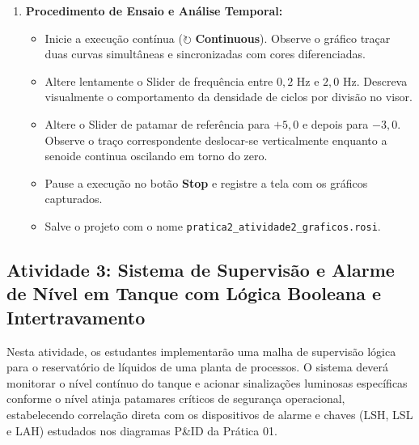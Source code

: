 \documentclass[11pt,a4paper]{article}
\begin{document}
\begin{enumerate}
\begin{itemize}
    \end{itemize}
    \item \textbf{Procedimento de Ensaio e Análise Temporal:}
    \begin{itemize}
        \item Inicie a execução contínua ($\circlearrowright$ \textbf{Continuous}). Observe o gráfico traçar duas curvas simultâneas e sincronizadas com cores diferenciadas.
        \item Altere lentamente o Slider de frequência entre $0{,}2\text{ Hz}$ e $2{,}0\text{ Hz}$. Descreva visualmente o comportamento da densidade de ciclos por divisão no visor.
        \item Altere o Slider de patamar de referência para $+5{,}0$ e depois para $-3{,}0$. Observe o traço correspondente deslocar-se verticalmente enquanto a senoide continua oscilando em torno do zero.
        \item Pause a execução no botão \textbf{Stop} e registre a tela com os gráficos capturados.
        \item Salve o projeto com o nome \texttt{pratica2\_atividade2\_graficos.rosi}.
    \end{itemize}
\end{enumerate}

\vspace{0.05cm}

\subsection{Atividade 3: Sistema de Supervisão e Alarme de Nível em Tanque com Lógica Booleana e Intertravamento}

Nesta atividade, os estudantes implementarão uma malha de supervisão lógica para o reservatório de líquidos de uma planta de processos. O sistema deverá monitorar o nível contínuo do tanque e acionar sinalizações luminosas específicas conforme o nível atinja patamares críticos de segurança operacional, estabelecendo correlação direta com os dispositivos de alarme e chaves (LSH, LSL e LAH) estudados nos diagramas P\&ID da Prática 01.
\end{document}
